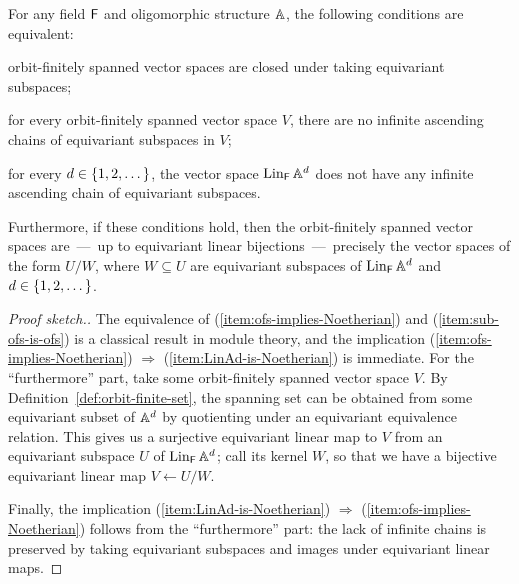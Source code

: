 \begin{theorem}\label{thm:ACP}
    For any field $\mathsf{F}$ and oligomorphic structure $\mathbb{A}$, the following conditions are equivalent: 
    \begin{alphaenumerate}
        \item\label{item:sub-ofs-is-ofs}
        orbit-finitely spanned vector spaces are closed under taking equivariant subspaces; 
        
        \item\label{item:ofs-implies-Noetherian}
        for every orbit-finitely spanned vector space $V$, there are no infinite ascending chains of equivariant subspaces in $V$;

        \item\label{item:LinAd-is-Noetherian}
        for every $d \in \{1,2,\dots\}$, the vector space 
        $
            \operatorname{Lin}_{\mathsf{F}} \mathbb{A}^d
        $ does not have any infinite ascending chain of equivariant subspaces.
    \end{alphaenumerate}
    Furthermore, if these conditions hold, then the orbit-finitely spanned vector spaces are~---~up to equivariant linear bijections~---~precisely the vector spaces of the form $U/W$, 
    where $W \subseteq U$ are equivariant subspaces of $\operatorname{Lin}_{\mathsf{F}} \mathbb{A}^d$ and $d \in \{1,2,\dots\}$.
\end{theorem}
\begin{proof}[Proof sketch.]
    The equivalence of (\ref{item:ofs-implies-Noetherian}) and (\ref{item:sub-ofs-is-ofs}) is a classical result in module theory, and the implication (\ref{item:ofs-implies-Noetherian}) $\Rightarrow$ (\ref{item:LinAd-is-Noetherian}) is immediate.
%
   For the ``furthermore'' part,
       take some orbit-finitely spanned vector space $V$. 
        By Definition~\ref{def:orbit-finite-set}, the spanning set can be obtained from some equivariant subset of $\mathbb{A}^d$ by quotienting under an equivariant equivalence relation. 
        This gives us a surjective equivariant linear map to $V$ from an equivariant subspace $U$ of $\operatorname{Lin}_{\mathsf{F}} \mathbb{A}^d$; 
        call its kernel $W$, so that we have a bijective equivariant linear map $V \leftarrow U/W$. 

    Finally, the implication (\ref{item:LinAd-is-Noetherian}) $\Rightarrow$  (\ref{item:ofs-implies-Noetherian})  follows from the ``furthermore'' part: 
    the lack of infinite chains is preserved by taking equivariant subspaces and images under equivariant linear maps. 
\end{proof}


